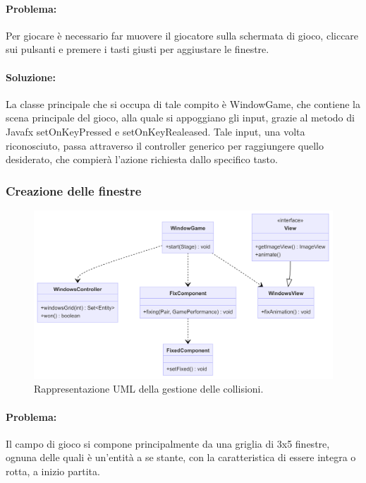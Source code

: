 \documentclass[a4paper,12pt]{report}
\begin{document}
\paragraph{Problema:}
Per giocare è necessario far muovere il giocatore sulla schermata di gioco, cliccare sui pulsanti e premere i tasti giusti per aggiustare le finestre.

\paragraph{Soluzione:}
La classe principale che si occupa di tale compito è WindowGame, che contiene la scena principale del gioco, alla quale si appoggiano gli input, grazie al metodo di Javafx setOnKeyPressed e setOnKeyRealeased.
Tale input, una volta riconosciuto, passa attraverso il controller generico per raggiungere quello desiderato, che compierà l'azione richiesta dallo specifico tasto.

\subsubsection{Creazione delle finestre}

\begin{figure}[H]
\centering{}
\includegraphics[width=\textwidth]{img/windows.png}
\caption{Rappresentazione UML della gestione delle collisioni.}
\end{figure}

\paragraph{Problema:}
Il campo di gioco si compone principalmente da una griglia di 3x5 finestre, ognuna delle quali è un'entità a se stante, con la caratteristica di essere integra o rotta, a inizio partita.
\end{document}
